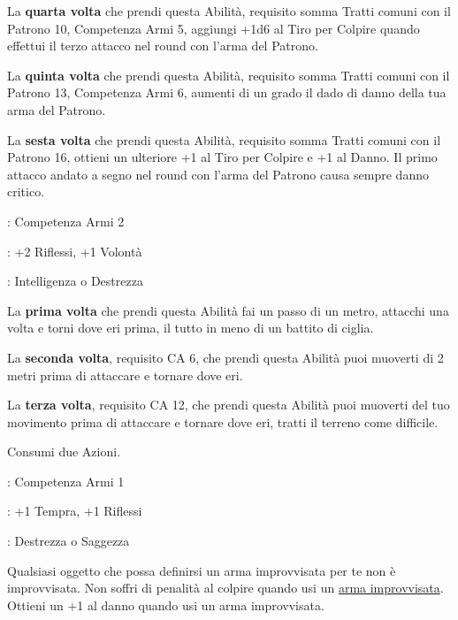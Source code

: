 \begin{multicols}{2}
La \textbf{quarta volta} che prendi questa Abilità, requisito somma Tratti comuni con il Patrono 10, Competenza Armi 5, aggiungi +1d6 al Tiro per Colpire quando effettui il terzo attacco nel round con l'arma del Patrono.

La \textbf{quinta volta} che prendi questa Abilità, requisito somma Tratti comuni con il Patrono 13, Competenza Armi 6, aumenti di un grado il dado di danno della tua arma del Patrono.

La \textbf{sesta volta} che prendi questa Abilità, requisito somma Tratti comuni con il Patrono 16, ottieni un ulteriore +1 al Tiro per Colpire e +1 al Danno. Il primo attacco andato a segno nel round con l'arma del Patrono causa sempre danno critico.

\begin{description}[noitemsep, topsep=0pt, parsep=0pt, partopsep=0pt, leftmargin=0cm, labelwidth=2.5cm]
    \item[\textbf{Requisito}]: Competenza Armi 2
    \item[\textbf{Tiri Salvezza}]: +2 Riflessi, +1 Volontà
    \item[\textbf{Caratteristica}]: Intelligenza o Destrezza
\end{description}

La \textbf{prima volta} che prendi questa Abilità fai un passo di un metro, attacchi una volta e torni dove eri prima, il tutto in meno di un battito di ciglia.

La \textbf{seconda volta}, requisito CA 6, che prendi questa Abilità puoi muoverti di 2 metri prima di attaccare e tornare dove eri.

La \textbf{terza volta}, requisito CA 12, che prendi questa Abilità puoi muoverti del tuo movimento prima di attaccare e tornare dove eri, tratti il terreno come difficile.

Consumi due Azioni.

\begin{description}[noitemsep, topsep=0pt, parsep=0pt, partopsep=0pt, leftmargin=0cm, labelwidth=2.5cm]
    \item[\textbf{Requisito}]: Competenza Armi 1
    \item[\textbf{Tiri Salvezza}]: +1 Tempra, +1 Riflessi
    \item[\textbf{Caratteristica}]: Destrezza o Saggezza
\end{description}

Qualsiasi oggetto che possa definirsi un arma improvvisata per te non è improvvisata.
Non soffri di penalità al colpire quando usi un \hyperlink{armaimprovvisata}{arma improvvisata}. Ottieni un +1 al danno quando usi un arma improvvisata.


\end{multicols}
